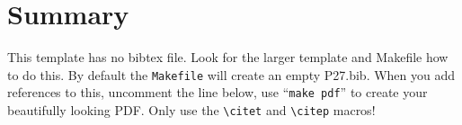 \documentclass[11pt,twoside]{article}
\begin{document}
\section{Summary}

This template has no bibtex file.  Look for the larger template and
Makefile how to do this. By default the {\tt Makefile} will create an
empty P27.bib. When you add references to this, uncomment the
line \verb++ below, use ``{\tt make pdf}'' to create
your beautifully looking PDF. Only use the
\verb"\citet" and \verb"\citep" macros!



% 


\end{document}
